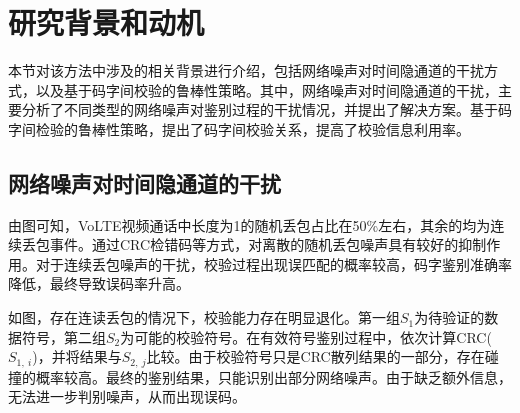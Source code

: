 \section{研究背景和动机}
\label{chap:hash:motivation}

本节对该方法中涉及的相关背景进行介绍，包括网络噪声对时间隐通道的干扰方式，以及基于码字间校验的鲁棒性策略。其中，网络噪声对时间隐通道的干扰，主要分析了不同类型的网络噪声对鉴别过程的干扰情况，并提出了解决方案。基于码字间检验的鲁棒性策略，提出了码字间校验关系，提高了校验信息利用率。

\subsection{网络噪声对时间隐通道的干扰}
\label{chap:hash:motivation:noise}

由图可知，VoLTE视频通话中长度为1的随机丢包占比在50\%左右，其余的均为连续丢包事件。通过CRC检错码等方式，对离散的随机丢包噪声具有较好的抑制作用。对于连续丢包噪声的干扰，校验过程出现误匹配的概率较高，码字鉴别准确率降低，最终导致误码率升高。


如图，存在连读丢包的情况下，校验能力存在明显退化。第一组$S_{1}$为待验证的数据符号，第二组$S_{2}$为可能的校验符号。在有效符号鉴别过程中，依次计算CRC($S_{1,\ i}$)，并将结果与$S_{2,\ j}$比较。由于校验符号只是CRC散列结果的一部分，存在碰撞的概率较高。最终的鉴别结果，只能识别出部分网络噪声。由于缺乏额外信息，无法进一步判别噪声，从而出现误码。


